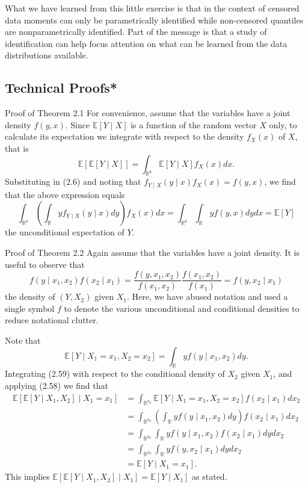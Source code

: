\documentclass[10pt]{article}
\begin{document}
What we have learned from this little exercise is that in the context of censored data moments can only be parametrically identified while non-censored quantiles are nonparametrically identified. Part of the message is that a study of identification can help focus attention on what can be learned from the data distributions available.

\subsection{Technical Proofs*}
Proof of Theorem 2.1 For convenience, assume that the variables have a joint density $f(y, x)$. Since $\mathbb{E}[Y \mid X]$ is a function of the random vector $X$ only, to calculate its expectation we integrate with respect to the density $f_{X}(x)$ of $X$, that is
$$
\mathbb{E}[\mathbb{E}[Y \mid X]]=\int_{\mathbb{R}^{k}} \mathbb{E}[Y \mid X] f_{X}(x) d x .
$$
Substituting in (2.6) and noting that $f_{Y \mid X}(y \mid x) f_{X}(x)=f(y, x)$, we find that the above expression equals
$$
\int_{\mathbb{R}^{k}}\left(\int_{\mathbb{R}} y f_{Y \mid X}(y \mid x) d y\right) f_{X}(x) d x=\int_{\mathbb{R}^{k}} \int_{\mathbb{R}} y f(y, x) d y d x=\mathbb{E}[Y]
$$
the unconditional expectation of $Y$.

Proof of Theorem 2.2 Again assume that the variables have a joint density. It is useful to observe that
$$
f\left(y \mid x_{1}, x_{2}\right) f\left(x_{2} \mid x_{1}\right)=\frac{f\left(y, x_{1}, x_{2}\right)}{f\left(x_{1}, x_{2}\right)} \frac{f\left(x_{1}, x_{2}\right)}{f\left(x_{1}\right)}=f\left(y, x_{2} \mid x_{1}\right)
$$
the density of $\left(Y, X_{2}\right)$ given $X_{1}$. Here, we have abused notation and used a single symbol $f$ to denote the various unconditional and conditional densities to reduce notational clutter.

Note that
$$
\mathbb{E}\left[Y \mid X_{1}=x_{1}, X_{2}=x_{2}\right]=\int_{\mathbb{R}} y f\left(y \mid x_{1}, x_{2}\right) d y .
$$
Integrating (2.59) with respect to the conditional density of $X_{2}$ given $X_{1}$, and applying (2.58) we find that
$$
\begin{aligned}
\mathbb{E}\left[\mathbb{E}\left[Y \mid X_{1}, X_{2}\right] \mid X_{1}=x_{1}\right] &=\int_{\mathbb{R}^{k_{2}}} \mathbb{E}\left[Y \mid X_{1}=x_{1}, X_{2}=x_{2}\right] f\left(x_{2} \mid x_{1}\right) d x_{2} \\
&=\int_{\mathbb{R}^{k_{2}}}\left(\int_{\mathbb{R}} y f\left(y \mid x_{1}, x_{2}\right) d y\right) f\left(x_{2} \mid x_{1}\right) d x_{2} \\
&=\int_{\mathbb{R}^{k_{2}}} \int_{\mathbb{R}} y f\left(y \mid x_{1}, x_{2}\right) f\left(x_{2} \mid x_{1}\right) d y d x_{2} \\
&=\int_{\mathbb{R}^{k_{2}}} \int_{\mathbb{R}} y f\left(y, x_{2} \mid x_{1}\right) d y d x_{2} \\
&=\mathbb{E}\left[Y \mid X_{1}=x_{1}\right] .
\end{aligned}
$$
This implies $\mathbb{E}\left[\mathbb{E}\left[Y \mid X_{1}, X_{2}\right] \mid X_{1}\right]=\mathbb{E}\left[Y \mid X_{1}\right]$ as stated.
\end{document}
